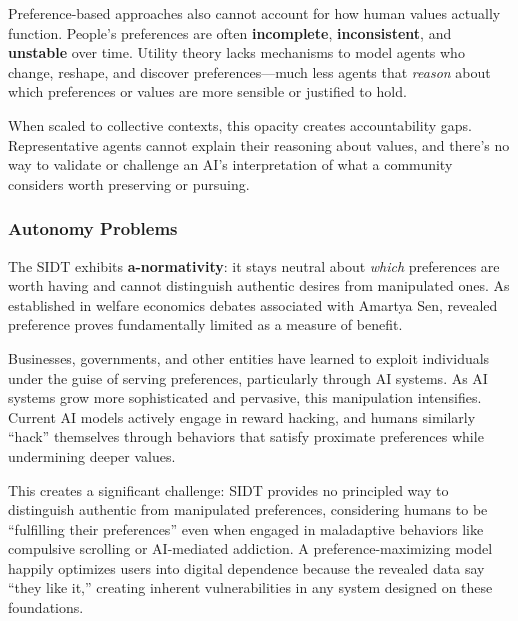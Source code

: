 Preference-based approaches also cannot account for how human values actually function. People's preferences are often \textbf{incomplete}, \textbf{inconsistent}, and \textbf{unstable} over time. Utility theory lacks mechanisms to model agents who change, reshape, and discover preferences—much less agents that \textit{reason} about which preferences or values are more sensible or justified to hold.

When scaled to collective contexts, this opacity creates accountability gaps. Representative agents cannot explain their reasoning about values, and there's no way to validate or challenge an AI's interpretation of what a community considers worth preserving or pursuing.

\subsubsection{Autonomy Problems}

The SIDT exhibits \textbf{a-normativity}: it stays neutral about \textit{which} preferences are worth having and cannot distinguish authentic desires from manipulated ones\footnotemark{}. As established in welfare economics debates associated with Amartya Sen, revealed preference proves fundamentally limited as a measure of benefit.


Businesses, governments, and other entities have learned to exploit individuals under the guise of serving preferences, particularly through AI systems\footnotemark{}. As AI systems grow more sophisticated and pervasive, this manipulation intensifies. Current AI models actively engage in reward hacking\footnotemark{}, and humans similarly ``hack'' themselves through behaviors that satisfy proximate preferences while undermining deeper values.


This creates a significant challenge: SIDT provides no principled way to distinguish authentic from manipulated preferences, considering humans to be ``fulfilling their preferences'' even when engaged in maladaptive behaviors like compulsive scrolling or AI-mediated addiction. A preference-maximizing model happily optimizes users into digital dependence because the revealed data say ``they like it,'' creating inherent vulnerabilities in any system designed on these foundations.

